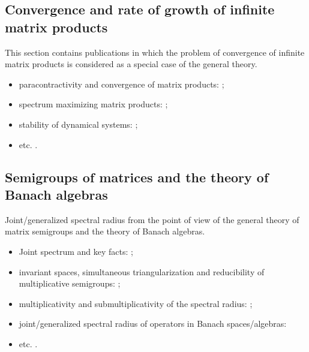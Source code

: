 \documentclass[a4paper,fleqn]{article}
\let\cite=\citep
\begin{document}
\subsection*{Convergence and rate of growth of infinite matrix products}
This section contains publications in which the problem of convergence of infinite matrix products is considered as a special case of the general theory.

\begin{itemize}
\item paracontractivity and convergence of matrix products: \cite{BeynEls96, BE:EJLA97, NeuSch:ArXiv98, VEB:LAA00, Mojskerc:LAA14, WangCheng:LMA16};
\item spectrum maximizing matrix products:  \cite{BochiLas:SAIMJMAA24, CGSZ:LAA10, JSRpack, GugProt:SIAMJMAA16, GugZen:LAA08, Koz:SAIMJMAA25, Laskawiec:LAA25, Vladimirov:ArXiv24};
\item stability of dynamical systems: \cite{Ahmadi08, AhmPar:CDC05, Bar:CDC05, BrayTong:TCS79, BrayTong:TCS80, GugZen:LNM14, Koz:AiT90:10:e, AKKK:92:e, ShihWP:LAA97, SBKK:CDC97, Shih:LAA99, KasBh:2000, BTV:MTNS02};
\item etc. \cite{AndoShih:SIAM:98, BerWang:LAA92, BEN:ETNA94, CiconePhD11, Cohen:MPCPS79, DaubLag:LAA92, DaubLag:LAA01, EF:LAA97, FLS:ETDS19, GugZen:LAA01, GurRod:SIAMJMAA97, GugZen:LAA03, Hajnal:MPCPS76, Hartfiel02, Holtz:EJLA00, HR:APM12, Koz:DDNS18, Koz:ArXiv20, Mate:PAMS98, Mate:FM99, NSch:LAA99, PJ:LAA13, Shen:LAA00, ShihPang:AJIFAC08, SU:SIAMJMAA94, Thomas:Arxiv18, Thomas:ArXiv22, Vlad:ArXiv16}.
\end{itemize}

\subsection*{Semigroups of matrices and the theory of Banach algebras}
Joint/generalized spectral radius from the point of view of the general theory of matrix semigroups and the theory of Banach algebras.

\begin{itemize}
\item Joint spectrum and key facts: \cite{Bell:LAA05, BerWang:LAA92,
BreSert:LMS21, EE:PAMS04, GurRod:SIAMJMAA97, Lur:LAA06-2, RS:PAMS95,
Sert:Thesis16, Sert:CRMASP17};
\item invariant spaces, simultaneous triangularization and reducibility of multiplicative semigroups: \cite{Drnov:97, Drnovsek:SM97, Drn:IEOT01, GPRSTT:P10, Guinand:PAMS82, HNRRR:HJM91, LMMR:JOT98, OmRadj:LAA97, Prot:FPM96:e, Radj:IUMJ90, RRS:PAMS00, Szep:AMH86};
\item multiplicativity and submultiplicativity of the spectral radius: \cite{LR:CJM95, OmRadj:LAA97, ProtVoy:LAA17};
\item joint/generalized spectral radius of operators in Banach spaces/algebras: \cite{BD:StochDyn21, BF:AIF21, Bogdanovic:ArXiv23, BP:LMA23, EE:PAMS04, LS:LAA02, KisShulTur:20, Morris:JFA12, Muller:APM97, Pep:LMA11, Peperko:LAA12, RS:PAMS95, ShulTur:ArXiv12, ShulTur:JFA00, ShulTur:SM02, Turovskii:JFA99, TurShul:FAP00, TurShul:FAP12}
\item etc. \cite{Javaheri:JMAA13, ManSim:TCS78}.
\end{itemize}
\end{document}
